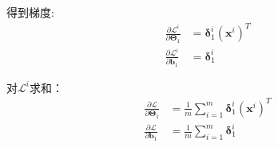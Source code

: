 \documentclass[12pt, a4paper]{article}
\newcommand{\imat}{\bm}
\newcommand{\ivec}{\bm}
\newcommand{\loss}{\mathcal{L}}
\newcommand{\thetam}{\imat{\Theta}}
\newcommand{\deltav}{\ivec{\delta}}
\newcommand{\bv}{\ivec{b}}
\newcommand{\xv}{\ivec{x}}
\begin{document}
\begin{enumerate}
            得到梯度:
            \begin{align*}
            \frac{\partial \loss^i}{\partial \thetam_1} &= \deltav_1^i (\xv^i)^T \\
            \frac{\partial \loss^i}{\partial \bv_1} &= \deltav_1^i
            \end{align*}

            对$\loss^i$求和：
            \begin{align}
            \frac{\partial \loss}{\partial \thetam_1} &= \frac{1}{m} \sum_{i=1}^{m} \deltav_1^i (\xv^i)^T \\
            \frac{\partial \loss}{\partial \bv_1} &= \frac{1}{m} \sum_{i=1}^{m} \deltav_1^i
            \end{align}

        \end{enumerate}
\end{document}
